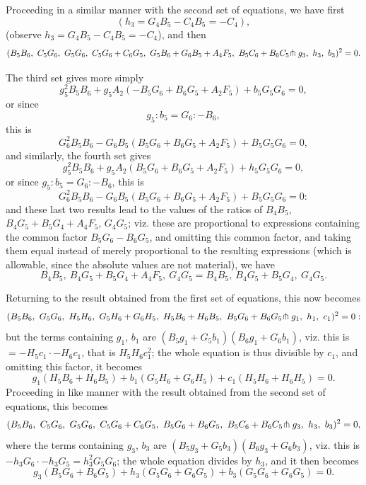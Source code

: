 \documentclass[11pt,a4paper]{article}
\begin{document}
\newpage
\setcounter{page}{319}

Proceeding in a similar manner with the second set of equations, we have first
\[
(h_{3} = G_{4}B_{5} - C_{4}B_{5} = -C_{4}),
\]
(observe $h_{3} = G_{4}B_{5} - C_{4}B_{5} = -C_{4}$), and then
\[
(B_{5}B_{6},\ C_{5}G_{6},\ G_{5}G_{6},\ C_{5}G_{6}+C_{6}G_{5},\ G_{5}B_{6}+G_{6}B_{5} + A_{4}F_{5},\ B_{5}C_{6}+B_{6}C_{5}\hspace{-0.2em}\pitchfork g_{3},\ h_{3},\ b_{3})^{2} = 0.
\]

The third set gives more simply
\[
g_{5}^{2}B_{5}B_{6} + g_{5}A_{2}(-B_{5}G_{6}+B_{6}G_{5}+A_{2}F_{5}) + b_{5}G_{5}G_{6} = 0,
\]
or since
\[
g_{5} : b_{5} = G_{6} : -B_{6},
\]
this is
\[
G_{6}^{2}B_{5}B_{6} - G_{6}B_{5}(B_{5}G_{6}+B_{6}G_{5}+A_{2}F_{5}) + B_{5}G_{5}G_{6} = 0,
\]
and similarly, the fourth set gives
\[
g_{5}^{2}B_{5}B_{6} + g_{5}A_{2}(B_{5}G_{6}+B_{6}G_{5}+A_{2}F_{5}) + h_{5}G_{5}G_{6} = 0,
\]
or since $g_{5} : b_{5} = G_{6} : -B_{6}$, this is
\[
G_{6}^{2}B_{5}B_{6} - G_{6}B_{5}(B_{5}G_{6}+B_{6}G_{5}+A_{2}F_{5}) + B_{5}G_{5}G_{6} = 0:
\]
and these last two results lead to the values of the ratios of $B_{4}B_{5}$, $B_{4}G_{5}+B_{5}G_{4}+A_{4}F_{5}$, $G_{4}G_{5}$; viz. these are proportional to expressions containing the common factor $B_{5}G_{6} - B_{6}G_{5}$, and omitting this common factor, and taking them equal instead of merely proportional to the resulting expressions (which is allowable, since the absolute values are not material), we have
\[
B_{4}B_{5},\ B_{4}G_{5}+B_{5}G_{4}+A_{4}F_{5},\ G_{4}G_{5} = B_{4}B_{5},\ B_{4}G_{5}+B_{5}G_{4},\ G_{4}G_{5}.
\]

Returning to the result obtained from the first set of equations, this now becomes
\[
(B_{5}B_{6},\ G_{5}G_{6},\ H_{5}H_{6},\ G_{5}H_{6}+G_{6}H_{5},\ H_{5}B_{6}+H_{6}B_{5},\ B_{5}G_{6}+B_{6}G_{5}\hspace{-0.2em}\pitchfork g_{1},\ h_{1},\ c_{1})^{2} = 0:
\]
but the terms containing $g_{1}$, $b_{1}$ are $(B_{5}g_{1}+G_{5}b_{1})(B_{6}g_{1}+G_{6}b_{1})$, viz. this is $= -H_{5}c_{1} \cdot -H_{6}c_{1}$, that is $H_{5}H_{6}c_{1}^{2}$; the whole equation is thus divisible by $c_{1}$, and omitting this factor, it becomes
\[
g_{1}(H_{5}B_{6}+H_{6}B_{5}) + b_{1}(G_{5}H_{6}+G_{6}H_{5}) + c_{1}(H_{5}H_{6}+H_{6}H_{5}) = 0.
\]
Proceeding in like manner with the result obtained from the second set of equations, this becomes
\[
(B_{5}B_{6},\ C_{5}G_{6},\ G_{5}G_{6},\ C_{5}G_{6}+C_{6}G_{5},\ B_{5}G_{6}+B_{6}G_{5},\ B_{5}C_{6}+B_{6}C_{5}\hspace{-0.2em}\pitchfork g_{3},\ h_{3},\ b_{3})^{2} = 0,
\]
where the terms containing $g_{3}$, $b_{3}$ are $(B_{5}g_{3}+G_{5}b_{3})(B_{6}g_{3}+G_{6}b_{3})$, viz. this is $-h_{3}G_{6} \cdot -h_{3}G_{5} = h_{3}^{2}G_{5}G_{6}$; the whole equation divides by $h_{3}$, and it then becomes
\[
g_{3}(B_{5}G_{6}+B_{6}G_{5}) + h_{3}(G_{5}G_{6}+G_{6}G_{5}) + b_{3}(G_{5}G_{6}+G_{6}G_{5}) = 0.
\]
\end{document}
